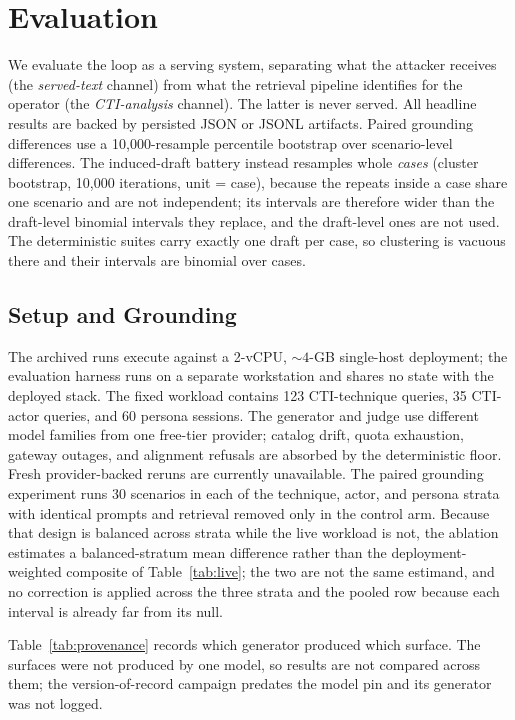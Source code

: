 \section{Evaluation}
\label{sec:evaluation}



We evaluate the loop as a serving system, separating what the attacker
receives (the \emph{served-text} channel) from what the retrieval pipeline
identifies for the operator (the \emph{CTI-analysis} channel). The latter is
never served. All headline results are backed by persisted JSON or JSONL
artifacts. Paired grounding differences use a 10,000-resample percentile
bootstrap over scenario-level differences. The induced-draft battery instead
resamples whole \emph{cases} (cluster bootstrap, 10,000 iterations, unit =
case), because the repeats inside a case share one scenario and are not
independent; its intervals are therefore wider than the draft-level binomial
intervals they replace, and the draft-level ones are not used. The
deterministic suites carry exactly one draft per case, so clustering is
vacuous there and their intervals are binomial over cases.

\subsection{Setup and Grounding}
\label{sec:setup}
The archived runs execute against a 2-vCPU, ${\sim}4$-GB single-host
deployment; the evaluation harness runs on a separate workstation and shares
no state with the deployed stack. The fixed
workload contains 123 CTI-technique queries, 35 CTI-actor queries, and 60
persona sessions. The generator and judge use different model families from
one free-tier provider; catalog drift, quota exhaustion, gateway outages, and
alignment refusals are absorbed by the deterministic floor. Fresh
provider-backed reruns are currently unavailable. The paired grounding
experiment runs 30 scenarios in each of the technique, actor, and persona
strata with identical prompts and retrieval removed only in the control arm.
Because that design is balanced across strata while the live workload is not,
the ablation estimates a balanced-stratum mean difference rather than the
deployment-weighted composite of Table~\ref{tab:live}; the two are not the
same estimand, and no correction is applied across the three strata and the
pooled row because each interval is already far from its null.

Table~\ref{tab:provenance} records which generator produced which surface.
The surfaces were not produced by one model, so results are not compared
across them; the version-of-record campaign predates the model pin and its
generator was not logged.

